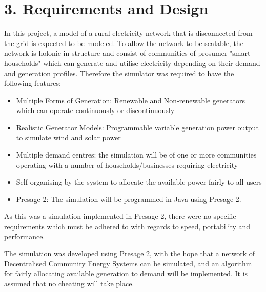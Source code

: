 \chapter{3. Requirements and Design}
\label{Requirements and Design}
In this project, a model of a rural electricity network that is disconnected from the grid is expected to be modeled. To allow the network to be scalable, the network is holonic in structure and consist of communities of prosumer "smart households" which can generate and utilise electricity depending on their demand and generation profiles. Therefore the simulator was required to have the following features:
\begin{itemize}
  \item Multiple Forms of Generation: Renewable and Non-renewable generators which can operate continuously or discontinuously
  \item Realistic Generator Models: Programmable variable generation power output to simulate wind and solar power
  \item Multiple demand centres: the simulation will be of one or more communities operating with a number of households/businesses requiring electricity
  \item Self organising by the system to allocate the available power fairly to all users
  \item Presage 2: The simulation will be programmed in Java using Presage 2.
\end{itemize}

As this was a simulation implemented in Presage 2, there were no specific requirements which must be adhered to with regards to speed, portability and performance.  

The simulation was developed using Presage 2, with the hope that a network of Decentralised Community Energy Systems can be simulated, and an algorithm for fairly allocating available generation to demand will be implemented. It is assumed that no cheating will take place.

